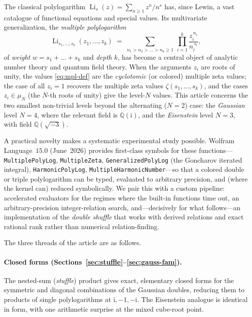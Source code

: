 \documentclass[11pt]{article}
\DeclareMathOperator{\Li}{Li}
\newcommand{\iu}{\mathrm{i}}
\theoremstyle{plain}
\theoremstyle{remark}
\begin{document}
The classical polylogarithm $\Li_s(z)=\sum_{n\ge1}z^n/n^s$ has, since Lewin, a vast catalogue of
functional equations and special values. Its multivariate generalization, the \emph{multiple
polylogarithm}
\begin{equation}\label{eq:mpl-def}
  \Li_{s_1,\dots,s_k}(z_1,\dots,z_k)
  \;=\;\sum_{n_1>n_2>\dots>n_k\ge1}\ \prod_{i=1}^{k}\frac{z_i^{\,n_i}}{n_i^{\,s_i}},
\end{equation}
of \emph{weight} $w=s_1+\dots+s_k$ and \emph{depth} $k$, has become a central object of analytic
number theory and quantum field theory. When the arguments $z_i$ are roots of unity, the values
\eqref{eq:mpl-def} are the \emph{cyclotomic} (or colored) multiple zeta values; the case of all
$z_i=1$ recovers the multiple zeta values $\zeta(s_1,\dots,s_k)$, and the cases $z_i\in\mu_N$ (the
$N$-th roots of unity) give the level-$N$ values. This article concerns the two smallest non-trivial
levels beyond the alternating ($N=2$) case: the \emph{Gaussian} level $N=4$, where the relevant
field is $\mathbb{Q}(\iu)$, and the \emph{Eisenstein} level $N=3$, with field
$\mathbb{Q}(\sqrt{-3})$.

A practical novelty makes a systematic experimental study possible. Wolfram Language~$15.0$
(June~2026) provides first-class symbols for these functions---\texttt{MultiplePolyLog},
\texttt{MultipleZeta}, \texttt{GeneralizedPolyLog} (the Goncharov iterated integral),
\texttt{HarmonicPolyLog}, \texttt{MultipleHarmonicNumber}---so that a colored double or triple
polylogarithm can be typed, evaluated to arbitrary precision, and (where the kernel can) reduced
symbolically. We pair this with a custom pipeline: accelerated evaluators for the regimes where the
built-in functions time out, an arbitrary-precision integer-relation search, and---decisively for
what follows---an implementation of the \emph{double shuffle} that works with derived relations and
exact rational rank rather than numerical relation-finding.

The three threads of the article are as follows.

\paragraph{Closed forms (Sections~\ref{sec:stuffle}--\ref{sec:gauss-fam}).} The nested-sum
(\emph{stuffle}) product gives exact, elementary closed forms for the symmetric and diagonal
combinations of the Gaussian doubles, reducing them to products of single polylogarithms at
$\iu,-1,-\iu$. The Eisenstein analogue is identical in form, with one arithmetic surprise at the
mixed cube-root point.
\end{document}
